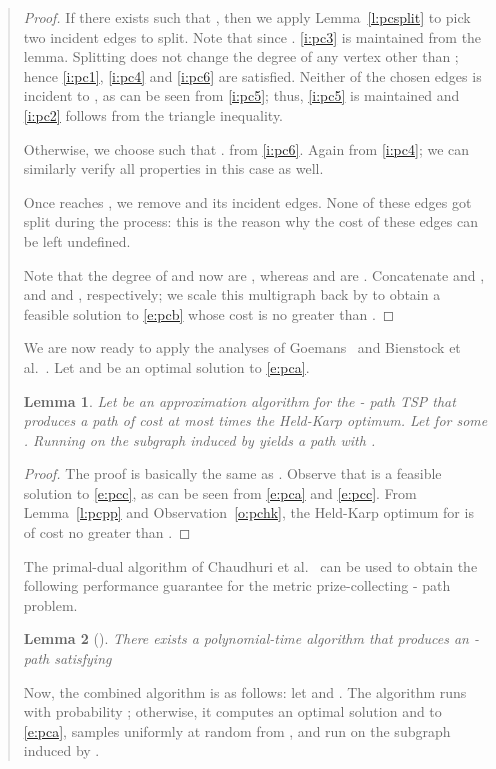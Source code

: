 \documentclass[11pt,letterpaper]{article}
\newtheorem{lemma}{Lemma}
\newcommand{\st}{\mbox{-} }
\begin{document}
\begin{quote}
\begin{proof}
If there exists  such that , then we apply Lemma~\ref{l:pcsplit} to pick two incident edges to split. Note that  since . \eqref{i:pc3} is maintained from the lemma. Splitting does not change the degree of any vertex other than ; hence \eqref{i:pc1}, \eqref{i:pc4} and \eqref{i:pc6} are satisfied. Neither of the chosen edges is incident to , as can be seen from \eqref{i:pc5}; thus, \eqref{i:pc5} is maintained and \eqref{i:pc2} follows from the triangle inequality.

Otherwise, we choose  such that .  from \eqref{i:pc6}. Again  from \eqref{i:pc4}; we can similarly verify all properties in this case as well.

Once  reaches , we remove  and its incident edges. None of these edges got split during the process: this is the reason why the cost of these edges can be left undefined.

Note that the degree of  and  now are , whereas  and  are . Concatenate  and , and  and , respectively; we scale this multigraph back by  to obtain a feasible solution to \eqref{e:pcb} whose cost is no greater than .
\end{proof}

We are now ready to apply the analyses of Goemans~\cite{G:pc} and Bienstock et al.~\cite{BGSW}. Let  and  be an optimal solution to \eqref{e:pca}.
\begin{lemma}\label{l:prounding}
Let  be an approximation algorithm for the \st path TSP that produces a path of cost at most  times the Held-Karp optimum. Let  for some . Running  on the subgraph  induced by  yields a path  with .
\end{lemma}
\begin{proof}The proof is basically the same as \cite{BGSW}. Observe that  is a feasible solution to \eqref{e:pcc}, as can be seen from \eqref{e:pca} and \eqref{e:pcc}. From Lemma~\ref{l:pcpp} and Observation~\ref{o:pchk}, the Held-Karp optimum for  is of cost no greater than .
\end{proof}

The primal-dual algorithm of Chaudhuri et al.~\cite{CGRT} can be used to obtain the following performance guarantee for the metric prize-collecting \st path problem.
\begin{lemma}[\cite{CGRT, ABHK}]\label{l:cgrtpg}
There exists a polynomial-time algorithm  that produces an \st path  satisfying
\end{lemma}

Now, the combined algorithm is as follows: let  and . The algorithm runs  with probability ; otherwise, it computes an optimal solution  and  to \eqref{e:pca}, samples  uniformly at random from , and run  on the subgraph induced by .


\end{quote}
\end{document}
